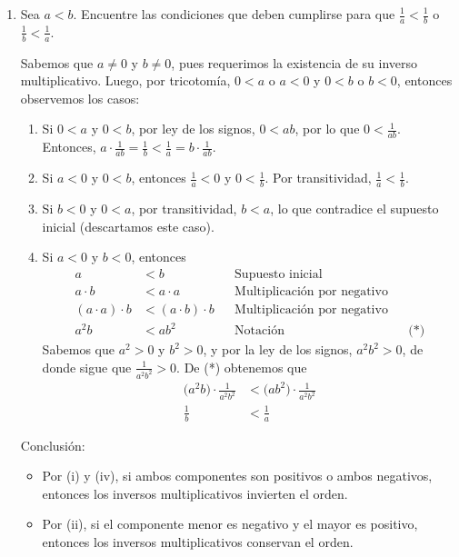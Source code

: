 \documentclass[11pt]{article}
\begin{document}
\begin{enumerate}[label=\alph*)]
    \item Sea $a<b$. Encuentre las condiciones que deben cumplirse para que $\frac{1}{a}<\frac{1}{b}$ o $\frac{1}{b}<\frac{1}{a}$.
    
    Sabemos que $a\neq 0$ y $b\neq 0$, pues requerimos la existencia de su inverso multiplicativo. Luego, por tricotomía, $0<a$ o $a<0$ y $0<b$ o $b<0$, entonces observemos los casos: \begin{enumerate}[label=\roman*)]
        \item Si $0<a$ y $0<b$, por ley de los signos, $0<ab$, por lo que $0<\frac{1}{ab}$. Entonces, $a\cdot \frac{1}{ab} = \frac{1}{b} < \frac{1}{a} = b \cdot \frac{1}{ab}$.
        \item Si $a<0$ y $0<b$, entonces $\frac{1}{a}<0$ y $0<\frac{1}{b}$. Por transitividad, $\frac{1}{a}<\frac{1}{b}$.
        \item Si $b<0$ y $0<a$, por transitividad, $b<a$, lo que contradice el supuesto inicial (descartamos este caso).
        \item Si $a<0$ y $b<0$, entonces\begin{align*}
            a &< b && \text{Supuesto inicial}\\
            a \cdot b &<a\cdot a&& \text{Multiplicación por negativo}\\
            (a \cdot a) \cdot b &<( a\cdot b)\cdot b&& \text{Multiplicación por negativo}\\
            a^2b &< ab^2 && \text{Notación} && \text{(*)}
        \end{align*} Sabemos que $a^2>0$ y $b^2>0$, y por la ley de los signos, $a^2b^2>0$, de donde sigue que $\frac{1}{a^2b^2}>0$. De (*) obtenemos que \begin{align*}
            \bigl(a^2b\bigr) \cdot \frac{1}{a^2b^2} &< \bigl(ab^2\bigr)\cdot \frac{1}{a^2b^2}\\
            \frac{1}{b} &< \frac{1}{a}
        \end{align*}
    \end{enumerate}
    Conclusión: \begin{itemize}
        \item Por (i) y (iv), si ambos componentes son positivos o ambos negativos, entonces los inversos multiplicativos invierten el orden.
        \item Por (ii), si el componente menor es negativo y el mayor es positivo, entonces los inversos multiplicativos conservan el orden.

\end{itemize}
\end{enumerate}
\end{document}
